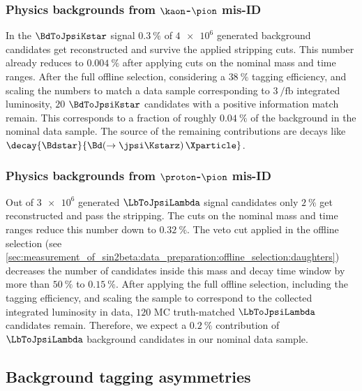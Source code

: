 \subsubsection{Physics backgrounds from $\kaon$-$\pion$ mis-ID}
\label{sec:measurement_of_sin2beta:physic_backgrounds:physic_backgrounds:kstar}

In the $\BdToJpsiKstar$ signal \MC $\SI{0.3}{\percent}$ of $\num{4e6}$ generated
background candidates get reconstructed and survive the applied stripping cuts.
This number already reduces to $\SI{0.004}{\percent}$ after applying cuts on the
nominal mass and time ranges. After the full offline selection, considering a
$\SI{38}{\percent}$ tagging efficiency, and scaling the numbers to match a data
sample corresponding to $\SI[separate-uncertainty=true]{3}{\per\femto\barn}$
integrated luminosity, $\num{20}$ $\BdToJpsiKstar$ candidates with a positive
\MC information match remain. This corresponds to a fraction of roughly
$\SI{0.04}{\percent}$ of the background in the nominal data sample. The source
of the remaining contributions are \eg decays like
$\decay{\Bdstar}{\Bd(\to\jpsi\Kstarz)\,\Xparticle}$.

\subsubsection{Physics backgrounds from $\proton$-$\pion$ mis-ID}
\label{sec:measurement_of_sin2beta:physic_backgrounds:physic_backgrounds:lambda}

Out of $\num{3e6}$ generated $\LbToJpsiLambda$ signal candidates only
$\SI{2}{\percent}$ get reconstructed and pass the stripping. The cuts on the
nominal mass and time ranges reduce this number down to $\SI{0.32}{\percent}$.
The veto cut applied in the offline selection (see
\cref{sec:measurement_of_sin2beta:data_preparation:offline_selection:daughters})
decreases the number of candidates inside this mass and decay time window by
more than $\SI{50}{\percent}$ to $\SI{0.15}{\percent}$. After applying the full
offline selection, including the tagging efficiency, and scaling the sample to
correspond to the collected integrated luminosity in data, $\num{120}$ MC
truth-matched $\LbToJpsiLambda$ candidates remain. Therefore, we expect a
$\SI{0.2}{\percent}$ contribution of $\LbToJpsiLambda$ background candidates in
our nominal data sample.

\subsection{Background tagging asymmetries}
\label{sec:measurement_of_sin2beta:physic_backgrounds:tagging_asymmetries}

